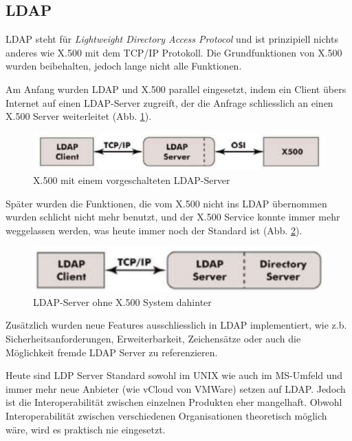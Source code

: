 \documentclass[a4paper, 11pt]{article}
\begin{document}
\newpage

\subsection{LDAP}
LDAP steht für \textit{Lightweight Directory Access Protocol} und ist prinzipiell nichts anderes wie X.500 mit dem TCP/IP Protokoll. Die Grundfunktionen von X.500 wurden beibehalten, jedoch lange nicht alle Funktionen.

Am Anfang wurden LDAP und X.500 parallel eingesetzt, indem ein Client übers Internet auf einen LDAP-Server zugreift, der die Anfrage schliesslich an einen X.500 Server weiterleitet (Abb. \ref{fig:ldapx500}).
\begin{figure}[htb]
	\centering
	\includegraphics[keepaspectratio=true,height=2.5\baselineskip]{ldapx500.PNG}
	\caption{X.500 mit einem vorgeschalteten LDAP-Server}
	\label{fig:ldapx500}
\end{figure}

Später wurden die Funktionen, die vom X.500 nicht ins LDAP übernommen wurden schlicht nicht mehr benutzt, und der X.500 Service konnte immer mehr weggelassen werden, was heute immer noch der Standard ist (Abb. \ref{fig:ldaponly}).

\begin{figure}[htb]
	\centering
	\includegraphics[keepaspectratio=true,height=2.5\baselineskip]{ldaponly.PNG}
	\caption{LDAP-Server ohne X.500 System dahinter}
	\label{fig:ldaponly}
\end{figure}

Zusätzlich wurden neue Features ausschliesslich in LDAP implementiert, wie z.b. Sicherheitsanforderungen, Erweiterbarkeit, Zeichensätze oder auch die Möglichkeit fremde LDAP Server zu referenzieren.

\vspace{10px}

\noindent Heute sind LDP Server Standard sowohl im UNIX wie auch im MS-Umfeld und immer mehr neue Anbieter (wie vCloud von VMWare) setzen auf LDAP. Jedoch ist die Interoperabilität zwischen einzelnen Produkten eher mangelhaft. Obwohl Interoperabilität zwischen verschiedenen Organisationen theoretisch möglich wäre, wird es praktisch nie eingesetzt.
\end{document}
